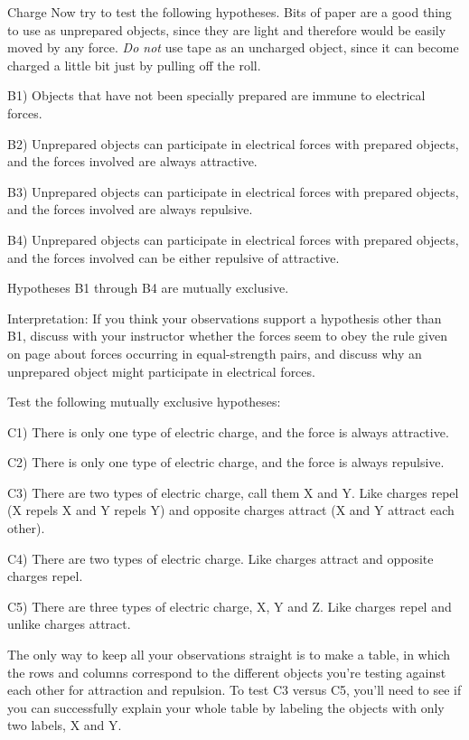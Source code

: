 \begin{lab}{Charge}
Now try to test the following hypotheses. Bits of paper are
a good thing to use as unprepared objects, since they are
light and therefore would be easily moved by any force.
\emph{Do not} use tape as an uncharged object, since it can
become charged a little bit just by pulling off the roll.

B1) Objects that have not been specially prepared are immune
to electrical forces.

B2) Unprepared objects can participate in electrical forces
with prepared objects, and the forces involved are always attractive.

B3) Unprepared objects can participate in electrical forces
with prepared objects, and the forces involved are always repulsive.

B4) Unprepared objects can participate in electrical forces
with prepared objects, and the forces involved can be either
repulsive of attractive.

Hypotheses B1 through B4 are mutually exclusive.

Interpretation: If you think your observations support a
hypothesis other than B1, discuss with your instructor
whether the forces seem to obey the rule given on page
\pageref{thirdlaw} about forces occurring in equal-strength
pairs, and
discuss why an unprepared object might participate
in electrical forces.


Test the following mutually exclusive hypotheses:

C1) There is only one type of electric charge, and the force
is always attractive.

C2) There is only one type of electric charge, and the force
is always repulsive.

C3) There are two types of electric charge, call them X
and Y. Like charges repel (X repels X and Y repels Y)
and opposite charges attract (X and Y attract each other).

C4) There are two types of electric charge. Like charges
attract and opposite charges repel.

C5) There are three types of electric charge, X, Y and
Z. Like charges repel and unlike charges attract.

The only way to keep all your observations straight is
to make a table, in which the rows and columns correspond
to the different objects you're testing against each other
for attraction and repulsion. To test C3 versus C5, you'll
need to see if you can successfully explain your whole
table by labeling the objects with only two labels, X and Y.


\end{lab}
